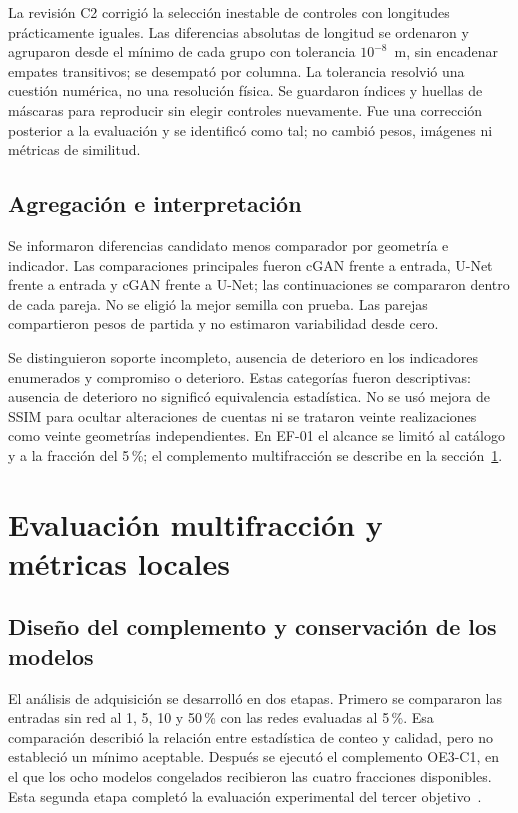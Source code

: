 La revisión C2 corrigió la selección inestable de controles con longitudes prácticamente iguales. Las diferencias absolutas de longitud se ordenaron y agruparon desde el mínimo de cada grupo con tolerancia $10^{-8}$~m, sin encadenar empates transitivos; se desempató por columna. La tolerancia resolvió una cuestión numérica, no una resolución física. Se guardaron índices y huellas de máscaras para reproducir sin elegir controles nuevamente. Fue una corrección posterior a la evaluación y se identificó como tal; no cambió pesos, imágenes ni métricas de similitud.

\subsection{Agregación e interpretación}
Se informaron diferencias candidato menos comparador por geometría e indicador. Las comparaciones principales fueron cGAN frente a entrada, U-Net frente a entrada y cGAN frente a U-Net; las continuaciones se compararon dentro de cada pareja. No se eligió la mejor semilla con prueba. Las parejas compartieron pesos de partida y no estimaron variabilidad desde cero.

Se distinguieron soporte incompleto, ausencia de deterioro en los indicadores enumerados y compromiso o deterioro. Estas categorías fueron descriptivas: ausencia de deterioro no significó equivalencia estadística. No se usó mejora de SSIM para ocultar alteraciones de cuentas ni se trataron veinte realizaciones como veinte geometrías independientes. En EF-01 el alcance se limitó al catálogo y a la fracción del 5\,\%; el complemento multifracción se describe en la sección~\ref{sec:met-adquisicion}.

\section{Evaluación multifracción y métricas locales}\label{sec:met-adquisicion}
\subsection{Diseño del complemento y conservación de los modelos}
El análisis de adquisición se desarrolló en dos etapas. Primero se compararon las entradas sin red al 1, 5, 10 y 50\,\% con las redes evaluadas al 5\,\%. Esa comparación describió la relación entre estadística de conteo y calidad, pero no estableció un mínimo aceptable. Después se ejecutó el complemento OE3-C1, en el que los ocho modelos congelados recibieron las cuatro fracciones disponibles. Esta segunda etapa completó la evaluación experimental del tercer objetivo~\parencite{repositorioMuografia2026}.


